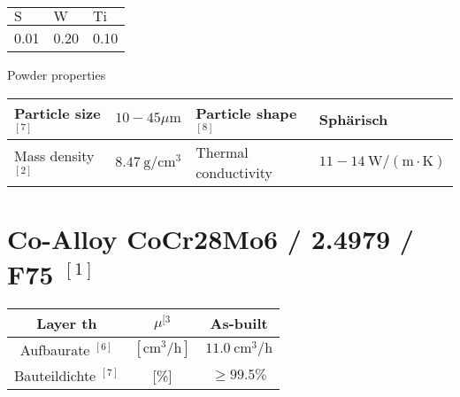 \documentclass[10pt]{article}
\begin{document}
\begin{center}
\begin{tabular}{|l|l|l|}
\hline
$\mathrm{S}$ & $\mathrm{W}$ & $\mathrm{Ti}$ \\
\hline
0.01 & 0.20 & 0.10 \\
\hline
\end{tabular}
\end{center}

Powder properties

\begin{center}
\begin{tabular}{|l|l|l|l|}
\hline
Particle size ${ }^{[7]}$ & $10-45 \mu \mathrm{m}$ & Particle shape ${ }^{[8]}$ & Sphärisch \\
\hline
Mass density ${ }^{[2]}$ & $8.47 \mathrm{~g} / \mathrm{cm}^{3}$ & Thermal conductivity & $11-14 \mathrm{~W} /(\mathrm{m} \cdot \mathrm{K})$ \\
\hline
\end{tabular}
\end{center}

\section*{Co-Alloy CoCr28Mo6 / 2.4979 / F75 ${ }^{[1]}$}
\begin{center}
\begin{tabular}{|c|c|c|}
\hline
Layer th & $\mu^{[3}$ & As-built \\
\hline
Aufbaurate $^{[6]}$ & $\left[\mathrm{cm}^{3} / \mathrm{h}\right]$ & $11.0 \mathrm{~cm}^{3} / \mathrm{h}$ \\
\hline
Bauteildichte $^{[7]}$ & [\%] & $\geq 99.5 \%$ \\
\hline
\end{tabular}
\end{center}
\end{document}
